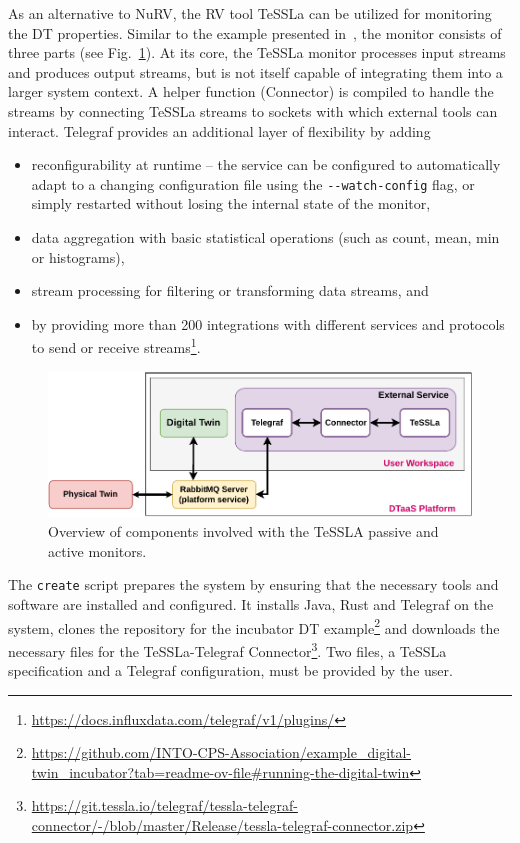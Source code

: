As an alternative to NuRV, the RV tool TeSSLa can be utilized for monitoring the DT properties.
Similar to the example presented in~\cite{TT-Connector}, the monitor consists of three parts (see Fig.~\ref{fig:architecture-diagram}).
At its core, the TeSSLa monitor processes input streams and produces output streams, but is not itself capable of integrating them into a larger system context.
A helper function (Connector) is compiled to handle the streams by connecting TeSSLa streams to sockets with which external tools can interact.
Telegraf provides an additional layer of flexibility by adding
\begin{itemize}
	\item reconfigurability at runtime -- the service can be configured to automatically adapt to a changing configuration file using the \lstinline{--watch-config} flag, or simply restarted without losing the internal state of the monitor,
	\item data aggregation with basic statistical operations (such as count, mean, min or histograms),
	\item stream processing for filtering or transforming data streams, and
	\item by providing more than 200 integrations with different services and protocols to send or receive streams\footnote{\url{https://docs.influxdata.com/telegraf/v1/plugins/}}.
\end{itemize}%
%
\begin{figure}[tbp]
	\centering
	\includegraphics[width=\linewidth]{images/TeSSLa-integration.pdf}
	\caption{Overview of components involved with the TeSSLA passive and active monitors.}
	\label{fig:architecture-diagram}
\end{figure}%
%
The \texttt{create} script prepares the system by ensuring that the necessary tools and software are installed and configured.
It installs Java, Rust and Telegraf on the system, clones the repository for the incubator DT example\footnote{\url{https://github.com/INTO-CPS-Association/example_digital-twin_incubator?tab=readme-ov-file\#running-the-digital-twin}} and downloads the necessary files for the TeSSLa-Telegraf Connector\footnote{\url{https://git.tessla.io/telegraf/tessla-telegraf-connector/-/blob/master/Release/tessla-telegraf-connector.zip}}. Two files, a TeSSLa specification and a Telegraf configuration, must be provided by the user.

